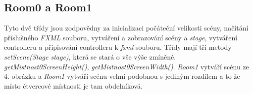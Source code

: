 \subsection{Room0 a Room1}
Tyto dvě třídy jsou zodpovědny za inicializaci počáteční velikosti scény, načítání příslušného \textit{FXML} souboru, vytváření a zobrazování  scény a \textit{stage}, vytváření controlleru a připisování controlleru k \textit{fxml} souboru. Třídy mají tři metody \textit{setScene(Stage stage)}, která se stará o vše výše zmíněné, \textit{ getMistnost0ScreenHeight()}, \textit{ getMistnost0ScreenWidth()}. \textit{Room1} vytváří scénu ze 4. obrázku a \textit{Room1} vytváří scénu velmi podobnou s jediným rozdílem a to že místo čtvercové místnosti je tam obdelníková. 
